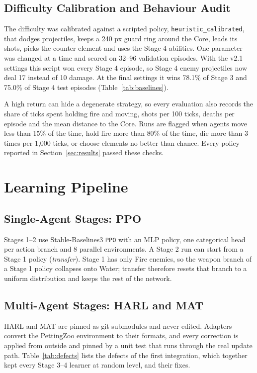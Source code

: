 \documentclass[11pt]{article}
\begin{document}
\subsection{Difficulty Calibration and Behaviour Audit}

The difficulty was calibrated against a scripted policy, \texttt{heuristic\_calibrated}, that dodges projectiles, keeps a 240 px guard ring around the Core, leads its shots, picks the counter element and uses the Stage 4 abilities. One parameter was changed at a time and scored on 32--96 validation episodes. With the v2.1 settings this script won every Stage 4 episode, so Stage 4 enemy projectiles now deal 17 instead of 10 damage. At the final settings it wins 78.1\% of Stage 3 and 75.0\% of Stage 4 test episodes (Table~\ref{tab:baselines}).

A high return can hide a degenerate strategy, so every evaluation also records the share of ticks spent holding fire and moving, shots per 100 ticks, deaths per episode and the mean distance to the Core. Runs are flagged when agents move less than 15\% of the time, hold fire more than 80\% of the time, die more than 3 times per 1{,}000 ticks, or choose elements no better than chance. Every policy reported in Section~\ref{sec:results} passed these checks.

\section{Learning Pipeline}
\label{sec:pipeline}

\subsection{Single-Agent Stages: PPO}

Stages 1--2 use Stable-Baselines3 \texttt{PPO} with an MLP policy, one categorical head per action branch and 8 parallel environments. A Stage 2 run can start from a Stage 1 policy (\emph{transfer}). Stage 1 has only Fire enemies, so the weapon branch of a Stage 1 policy collapses onto Water; transfer therefore resets that branch to a uniform distribution and keeps the rest of the network.

\subsection{Multi-Agent Stages: HARL and MAT}

HARL and MAT are pinned as git submodules and never edited. Adapters convert the PettingZoo environment to their formats, and every correction is applied from outside and pinned by a unit test that runs through the real update path. Table~\ref{tab:defects} lists the defects of the first integration, which together kept every Stage 3--4 learner at random level, and their fixes.
\end{document}
